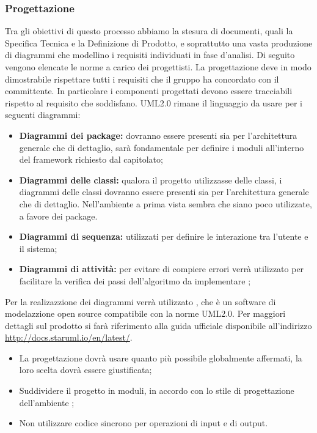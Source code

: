 \documentclass[a4paper,11pt]{article}
\begin{document}
		\subsubsection{ Progettazione}
			Tra gli obiettivi di questo processo abbiamo la stesura di documenti, quali la Specifica Tecnica e la Definizione di Prodotto, e soprattutto una vasta produzione di diagrammi  che modellino i requisiti individuati in fase d'analisi. Di seguito vengono elencate le norme a carico dei progettisti.
			La progettazione deve in modo dimostrabile rispettare tutti i requisiti che il gruppo ha concordato con il committente. In particolare i componenti progettati devono essere tracciabili rispetto al requisito che soddisfano.
			 \label{subsec:UML}
			UML2.0 rimane il linguaggio da usare per i seguenti diagrammi:
			\begin{itemize}
			\item\textbf{Diagrammi dei package:} dovranno essere presenti sia per l'architettura generale che di dettaglio, sarà fondamentale per definire i moduli all'interno del framework  richiesto dal capitolato;
			\item\textbf{Diagrammi delle classi:} qualora il progetto utilizzasse delle classi, i diagrammi delle classi dovranno essere presenti sia per l'architettura generale che di dettaglio. Nell'ambiente  a prima vista sembra che siano poco utilizzate, a favore dei package.
			\item\textbf{Diagrammi di sequenza:} utilizzati per definire le interazione tra l'utente e il sistema;
			\item\textbf{Diagrammi di attività:} per evitare di compiere errori verrà utilizzato per facilitare la verifica dei passi dell'algoritmo da implementare ;
			\end{itemize}
			Per la realizazzione dei diagrammi verrà utilizzato , che è un software di modelazzione open source compatibile con la norme UML2.0. Per maggiori dettagli sul prodotto si farà riferimento alla guida ufficiale disponibile all'indirizzo \url{http://docs.staruml.io/en/latest/}.
				\begin{itemize}
				\item La progettazione dovrà usare quanto più possibile  globalmente affermati, la loro scelta dovrà essere giustificata;
				\item Suddividere il progetto in moduli, in accordo con lo stile di progettazione dell'ambiente ;
				\item Non utilizzare codice sincrono per operazioni di input e di output.
				
				\end{itemize}
\end{document}
